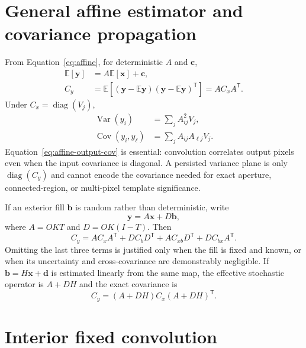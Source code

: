 \documentclass[11pt]{article}
\newcommand{\E}{\mathbb{E}}
\newcommand{\Cov}{\operatorname{Cov}}
\newcommand{\Var}{\operatorname{Var}}
\newcommand{\diag}{\operatorname{diag}}
\begin{document}
\section{General affine estimator and covariance propagation}
\label{sec:general}

From Equation~\eqref{eq:affine}, for deterministic $A$ and $\boldsymbol c$,
\begin{align}
 \E[\boldsymbol y] &= A\E[\boldsymbol x]+\boldsymbol c,
 \label{eq:affine-mean}\\
 C_y &= \E[(\boldsymbol y-\E\boldsymbol y)
                 (\boldsymbol y-\E\boldsymbol y)^{\mathsf T}]
      =A C_x A^{\mathsf T}.
 \label{eq:affine-cov-expanded}
\end{align}
Under $C_x=\diag(V_j)$,
\begin{align}
 \Var(y_i)&=\sum_j A_{ij}^2V_j,
 \label{eq:affine-diag-var}\\
 \Cov(y_i,y_\ell)&=\sum_j A_{ij}A_{\ell j}V_j.
 \label{eq:affine-output-cov}
\end{align}
Equation~\eqref{eq:affine-output-cov} is essential: convolution correlates
output pixels even when the input covariance is diagonal.  A persisted
variance plane is only $\diag(C_y)$ and cannot encode the covariance needed
for exact aperture, connected-region, or multi-pixel template significance.

If an exterior fill $\boldsymbol b$ is random rather than deterministic, write
\begin{equation}
 \boldsymbol y=A\boldsymbol x+D\boldsymbol b,
 \label{eq:random-fill-model}
\end{equation}
where $A=OKT$ and $D=OK(I-T)$.  Then
\begin{equation}
 C_y=A C_xA^{\mathsf T}+D C_bD^{\mathsf T}
     +A C_{xb}D^{\mathsf T}+D C_{bx}A^{\mathsf T}.
 \label{eq:random-fill-cov}
\end{equation}
Omitting the last three terms is justified only when the fill is fixed and
known, or when its uncertainty and cross-covariance are demonstrably
negligible.  If $\boldsymbol b=H\boldsymbol x+\boldsymbol d$ is estimated
linearly from the same map, the effective stochastic operator is
$A+DH$ and the exact covariance is
\begin{equation}
 C_y=(A+DH)C_x(A+DH)^{\mathsf T}.
 \label{eq:data-derived-fill-cov}
\end{equation}

\section{Interior fixed convolution}
\label{sec:interior}
\end{document}
